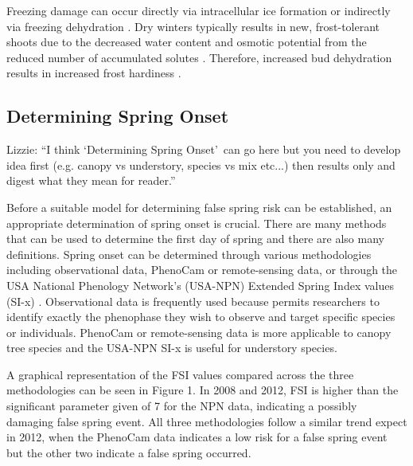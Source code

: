 \documentclass{article}\usepackage[]{graphicx}\usepackage[]{color}
\begin{document}
Freezing damage can occur directly via intracellular ice formation or indirectly via freezing dehydration \citep{Hofmann2015, Beck2004, Pearce2001}. Dry winters typically results in new, frost-tolerant shoots due to the decreased water content and osmotic potential from the reduced number of accumulated solutes \citep{Hofmann2015, Morin2007}. Therefore, increased bud dehydration results in increased frost hardiness \citep{Hofmann2015, Kathke2011, Poirier2010, Nielsen2009, Beck2007}.

\subsection*{Determining Spring Onset}
Lizzie: ``I think `Determining Spring Onset'\, can go here but you need to develop idea first (e.g. canopy vs understory, species vs mix etc...) then results only and digest what they mean for reader.''

Before a suitable model for determining false spring risk can be established, an appropriate determination of spring onset is crucial. There are many methods that can be used to determine the first day of spring and there are also many definitions. Spring onset can be determined through various methodologies including observational data, PhenoCam or remote-sensing data, or through the USA National Phenology Network's (USA-NPN) Extended Spring Index values (SI-x) \citep{USA-NPN2016}. Observational data is frequently used because permits researchers to identify exactly the phenophase they wish to observe and target specific species or individuals. PhenoCam or remote-sensing data is more applicable to canopy tree species and the USA-NPN SI-x is useful for understory species.

A graphical representation of the FSI values compared across the three methodologies can be seen in Figure 1. In 2008 and 2012, FSI is higher than the significant parameter given of 7 for the NPN data, indicating a possibly damaging false spring event. All three methodologies follow a similar trend expect in 2012, when the PhenoCam data indicates a low risk for a false spring event but the other two indicate a false spring occurred. 
\end{document}
